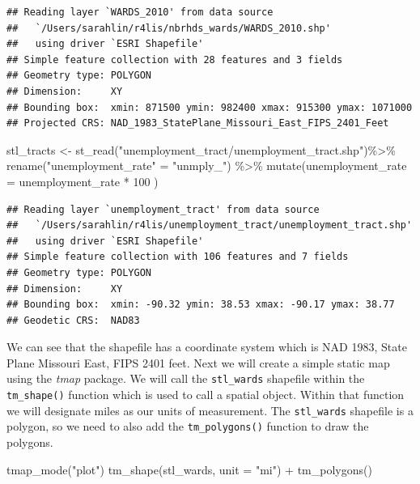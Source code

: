 \documentclass[
  krantz2]{krantz}
\makeatletter
\newenvironment{Shaded}{\begin{snugshade}}{\end{snugshade}}
\newcommand{\AttributeTok}[1]{\textcolor[rgb]{0.61,0.61,0.61}{#1}}
\newcommand{\DecValTok}[1]{\textcolor[rgb]{0.06,0.06,0.06}{#1}}
\newcommand{\FunctionTok}[1]{\textcolor[rgb]{0,0,0}{#1}}
\newcommand{\NormalTok}[1]{#1}
\newcommand{\OtherTok}[1]{\textcolor[rgb]{0.37,0.37,0.37}{#1}}
\newcommand{\SpecialCharTok}[1]{\textcolor[rgb]{0,0,0}{#1}}
\newcommand{\StringTok}[1]{\textcolor[rgb]{0.5,0.5,0.5}{#1}}
\newenvironment{kframe}{%
\medskip{}
\setlength{\fboxsep}{.8em}
 \def\at@end@of@kframe{}%
 \ifinner\ifhmode%
  \def\at@end@of@kframe{\end{minipage}}%
  \begin{minipage}{\columnwidth}%
 \fi\fi%
 \def\FrameCommand##1{\hskip\@totalleftmargin \hskip-\fboxsep
 \colorbox{shadecolor}{##1}\hskip-\fboxsep
     \hskip-\linewidth \hskip-\@totalleftmargin \hskip\columnwidth}%
 \MakeFramed {\advance\hsize-\width
   \@totalleftmargin\z@ \linewidth\hsize
   \@setminipage}}%
 {\par\unskip\endMakeFramed%
 \at@end@of@kframe}
\renewenvironment{Shaded}{\begin{kframe}}{\end{kframe}}
\makeatother
\begin{document}
\begin{verbatim}
## Reading layer `WARDS_2010' from data source
##   `/Users/sarahlin/r4lis/nbrhds_wards/WARDS_2010.shp'
##   using driver `ESRI Shapefile'
## Simple feature collection with 28 features and 3 fields
## Geometry type: POLYGON
## Dimension:     XY
## Bounding box:  xmin: 871500 ymin: 982400 xmax: 915300 ymax: 1071000
## Projected CRS: NAD_1983_StatePlane_Missouri_East_FIPS_2401_Feet
\end{verbatim}

\begin{Shaded}
\begin{Highlighting}[]
\NormalTok{stl\_tracts }\OtherTok{\textless{}{-}} \FunctionTok{st\_read}\NormalTok{(}\StringTok{"unemployment\_tract/unemployment\_tract.shp"}\NormalTok{)}\SpecialCharTok{\%\textgreater{}\%}
  \FunctionTok{rename}\NormalTok{(}\StringTok{"unemployment\_rate"} \OtherTok{=} \StringTok{"unmply\_"}\NormalTok{) }\SpecialCharTok{\%\textgreater{}\%}
  \FunctionTok{mutate}\NormalTok{(}\AttributeTok{unemployment\_rate =}\NormalTok{ unemployment\_rate }\SpecialCharTok{*} \DecValTok{100}\NormalTok{ )}
\end{Highlighting}
\end{Shaded}

\begin{verbatim}
## Reading layer `unemployment_tract' from data source
##   `/Users/sarahlin/r4lis/unemployment_tract/unemployment_tract.shp'
##   using driver `ESRI Shapefile'
## Simple feature collection with 106 features and 7 fields
## Geometry type: POLYGON
## Dimension:     XY
## Bounding box:  xmin: -90.32 ymin: 38.53 xmax: -90.17 ymax: 38.77
## Geodetic CRS:  NAD83
\end{verbatim}

We can see that the shapefile has a coordinate system which is NAD 1983, State Plane Missouri East, FIPS 2401 feet. Next we will create a simple static map using the \emph{tmap} package. We will call the \texttt{stl\_wards} shapefile within the \texttt{tm\_shape()} function which is used to call a spatial object. Within that function we will designate miles as our units of measurement. The \texttt{stl\_wards} shapefile is a polygon, so we need to also add the \texttt{tm\_polygons()} function to draw the polygons.

\begin{Shaded}
\begin{Highlighting}[]
\FunctionTok{tmap\_mode}\NormalTok{(}\StringTok{"plot"}\NormalTok{)}
\FunctionTok{tm\_shape}\NormalTok{(stl\_wards, }\AttributeTok{unit =} \StringTok{"mi"}\NormalTok{) }\SpecialCharTok{+}
  \FunctionTok{tm\_polygons}\NormalTok{()}
\end{Highlighting}
\end{Shaded}
\end{document}

